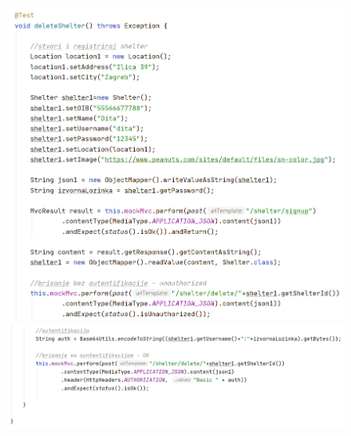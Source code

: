  		
 			\begin{figure}[H]
 					\hspace*{-0.93in}
 					\includegraphics[scale=0.71]{slike/shelter4.1.PNG}
 					\hspace*{-0.6in}
 					\includegraphics[scale=0.71]{slike/shelter4.2.PNG} %
 				\centering
 			\end{figure}
 	
 		
 		
